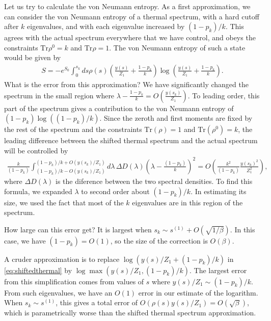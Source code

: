 \documentclass[11pt]{article}
\newcommand{\smax}{s_k}
\numberwithin{equation}{section}
\def\Tr{\text{Tr}}
\begin{document}
Let us try to calculate the von Neumann entropy. As a first approximation, we can consider the von Neumann entropy of a thermal spectrum, with a hard cutoff after $k$ eigenvalues, and with each eigenvalue increased by $(1- p_k)/k$. This agrees with the actual spectrum everywhere that we have control, and obeys the constraints $\Tr \rho^0 = k$ and $\Tr \rho = 1$. The von Neumann entropy of such a state would be given by
\begin{align}\label{eq:shiftedthermal}
S = - e^{S_0} \int_0^{\smax} ds \rho(s) \left(\frac{y(s)}{Z_1} + \frac{1 - p_k}{k} \right) \log \left(\frac{y(s)}{Z_1} + \frac{1 - p_k}{k} \right).
\end{align}
What is the error from this approximation? We have significantly changed the spectrum in the small region where $\lambda -\frac{1-p_k}{k} = O( \frac{y(\smax)}{Z_1})$. To leading order, this part of the spectrum gives a contribution to the von Neumann entropy of $(1 - p_k) \log((1-p_k)/k)$. Since the zeroth and first moments are fixed by the rest of the spectrum and the constraints $\Tr(\rho) = 1$ and $\Tr(\rho^0) = k$, the leading difference between the shifted thermal spectrum and the actual spectrum will be controlled by
\begin{align} \label{eq:blaaaaah}
\frac{k}{(1-p_k)}\int_{(1-p_k)/k - O(y(\smax)/Z_1)}^{(1-p_k)/k + O(y(\smax)/Z_1)} d \lambda\, \Delta D(\lambda) \left(\lambda - \frac{(1 - p_k)}{k}\right)^2  = O\left(\frac{k^2}{(1-p_k)} \frac{y(\smax)^2}{Z_1^2}\right),
\end{align}
where $\Delta D(\lambda)$ is the diference between the two spectral densities. To find this formula, we expanded $\lambda$ to second order about $(1 - p_k)/k$. In estimating its size, we used the fact that most of the $k$ eigenvalues are in this region of the spectrum. 

How large can this error get? It is largest when $\smax \sim s^{(1)} + O(\sqrt{1/\beta})$. In this case, we have $(1-p_k) = O(1)$, so the size of the correction is $O(\beta)$.

A cruder approximation is to replace $ \log \left(y(s)/Z_1 +(1 - p_k)/k \right)$ in \eqref{eq:shiftedthermal} by $\log \max(y(s)/Z_1, (1 - p_k)/k)$. The largest error from this simplification comes from values of $s$ where $y(s)/Z_1 \sim (1 - p_k)/k$. From such eigenvalues, we have an $O(1)$ error in our estimate of the logarithm. When $\smax \sim s^{(1)}$, this gives a total error of $O(\rho(s)y(s)/Z_1) = O(\sqrt{\beta})$, which is parametrically worse than the shifted thermal spectrum approximation.
\end{document}
